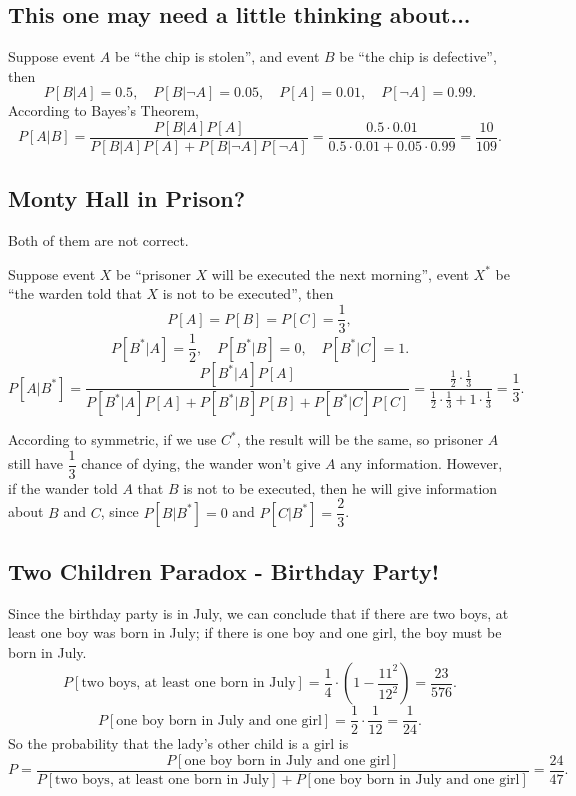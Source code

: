 \documentclass[11pt,a4paper]{article}
\begin{document}
\subsection{This one may need a little thinking about...}

Suppose event $A$ be ``the chip is stolen'', and event $B$ be ``the chip is defective'', then
$$P[B|A]=0.5,\quad P[B|\neg A]=0.05,\quad P[A]=0.01,\quad P[\neg A]=0.99.$$
According to Bayes's Theorem,
$$P[A|B]=\frac{P[B|A]P[A]}{P[B|A]P[A]+P[B|\neg A]P[\neg A]}=\frac{0.5\cdot0.01}{0.5\cdot0.01+0.05\cdot0.99}=\frac{10}{109}.$$

\subsection{Monty Hall in Prison?}

Both of them are not correct.

Suppose event $X$ be ``prisoner $X$ will be executed the next morning'', event $X^*$ be ``the warden told that $X$ is not to be executed'', then
$$P[A]=P[B]=P[C]=\frac{1}{3},$$
$$P[B^*|A]=\frac{1}{2},\quad P[B^*|B]=0,\quad P[B^*|C]=1.$$
$$P[A|B^*]=\frac{P[B^*|A]P[A]}{P[B^*|A]P[A]+P[B^*|B]P[B]+P[B^*|C]P[C]}=\frac{\frac{1}{2}\cdot\frac{1}{3}}{\frac{1}{2}\cdot\frac{1}{3}+1\cdot\frac{1}{3}}=\frac{1}{3}.$$

According to symmetric, if we use $C^*$, the result will be the same, so prisoner $A$ still have $\dfrac{1}{3}$ chance of dying, the wander won't give $A$ any information. However, if the wander told $A$ that $B$ is not to be executed, then he will give information about $B$ and $C$, since $P[B|B^*]=0$ and $P[C|B^*]=\dfrac{2}{3}$.

\subsection{Two Children Paradox - Birthday Party!}

Since the birthday party is in July, we can conclude that if there are two boys, at least one boy was born in July; if there is one boy and one girl, the boy must be born in July.
$$P[\textrm{two boys, at least one born in July}]=\frac{1}{4}\cdot\left(1-\frac{11^2}{12^2}\right)=\frac{23}{
576}.$$
$$P[\textrm{one boy born in July and one girl}]=\frac{1}{2}\cdot\frac{1}{12}=\frac{1}{24}.$$
So the probability that the lady's other child is a girl is
$$P=\frac{P[\textrm{one boy born in July and one girl}]}{P[\textrm{two boys, at least one born in July}]+P[\textrm{one boy born in July and one girl}]}=\frac{24}{47}.$$
\end{document}
